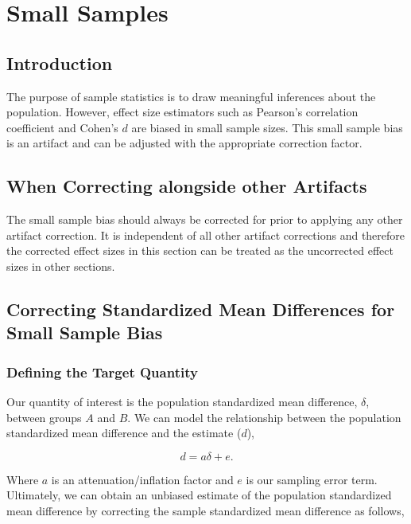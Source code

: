 \documentclass[
  letterpaper,
  DIV=11,
  numbers=noendperiod]{scrreprt}
\begin{document}

\chapter{Small Samples}\label{small-samples}

\section{Introduction}\label{introduction-1}

The purpose of sample statistics is to draw meaningful inferences about
the population. However, effect size estimators such as Pearson's
correlation coefficient and Cohen's \(d\) are biased in small sample
sizes. This small sample bias is an artifact and can be adjusted with
the appropriate correction factor.

\section{When Correcting alongside other
Artifacts}\label{when-correcting-alongside-other-artifacts}

The small sample bias should always be corrected for prior to applying
any other artifact correction. It is independent of all other artifact
corrections and therefore the corrected effect sizes in this section can
be treated as the uncorrected effect sizes in other sections.

\section{Correcting Standardized Mean Differences for Small Sample
Bias}\label{correcting-standardized-mean-differences-for-small-sample-bias}

\subsection{Defining the Target
Quantity}\label{defining-the-target-quantity}

Our quantity of interest is the population standardized mean difference,
\(\delta\), between groups \(A\) and \(B\). We can model the
relationship between the population standardized mean difference and the
estimate (\(d\)),

\[
d = a\delta+e.
\]

Where \(a\) is an attenuation/inflation factor and \(e\) is our sampling
error term. Ultimately, we can obtain an unbiased estimate of the
population standardized mean difference by correcting the sample
standardized mean difference as follows,
\end{document}
